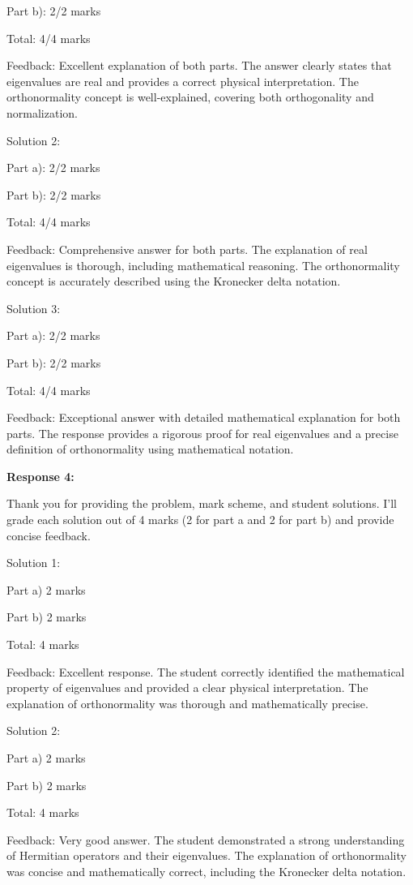 \documentclass[a4paper,11pt]{article}
\begin{document}
Part b): 2/2 marks

Total: 4/4 marks

Feedback: Excellent explanation of both parts. The answer clearly states that eigenvalues are real and provides a correct physical interpretation. The orthonormality concept is well-explained, covering both orthogonality and normalization.

Solution 2:

Part a): 2/2 marks

Part b): 2/2 marks

Total: 4/4 marks

Feedback: Comprehensive answer for both parts. The explanation of real eigenvalues is thorough, including mathematical reasoning. The orthonormality concept is accurately described using the Kronecker delta notation.

Solution 3:

Part a): 2/2 marks

Part b): 2/2 marks

Total: 4/4 marks

Feedback: Exceptional answer with detailed mathematical explanation for both parts. The response provides a rigorous proof for real eigenvalues and a precise definition of orthonormality using mathematical notation.

\bigskip
\textbf{Response 4:}

Thank you for providing the problem, mark scheme, and student solutions. I'll grade each solution out of 4 marks (2 for part a and 2 for part b) and provide concise feedback.

Solution 1:

Part a) 2 marks

Part b) 2 marks

Total: 4 marks

Feedback: Excellent response. The student correctly identified the mathematical property of eigenvalues and provided a clear physical interpretation. The explanation of orthonormality was thorough and mathematically precise.

Solution 2:

Part a) 2 marks

Part b) 2 marks

Total: 4 marks

Feedback: Very good answer. The student demonstrated a strong understanding of Hermitian operators and their eigenvalues. The explanation of orthonormality was concise and mathematically correct, including the Kronecker delta notation.
\end{document}
